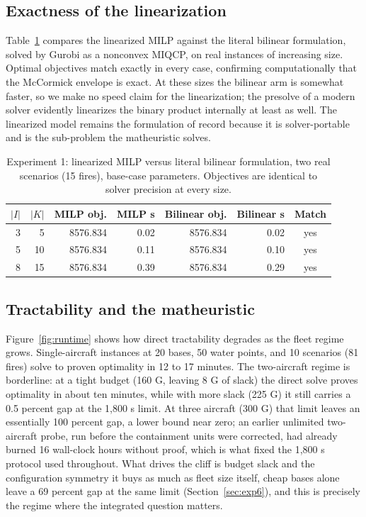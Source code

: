 \documentclass[11pt]{article}
\begin{document}
\subsection{Exactness of the linearization}
\label{sec:exp1}

Table~\ref{tab:exp1} compares the linearized MILP against the literal
bilinear formulation, solved by Gurobi as a nonconvex MIQCP, on real
instances of increasing size. Optimal objectives match exactly in
every case, confirming computationally that the McCormick envelope is
exact. At these sizes the bilinear arm is somewhat faster, so we make
no speed claim for the linearization; the presolve of a modern solver
evidently linearizes the binary product internally at least as well.
The linearized model remains the formulation of record because it is
solver-portable and is the sub-problem the matheuristic solves.

\begin{table}[!htbp]
\centering
\caption{Experiment 1: linearized MILP versus literal bilinear
formulation, two real scenarios (15 fires), base-case parameters.
Objectives are identical to solver precision at every size.}
\label{tab:exp1}
\small
\begin{tabular}{rrrrrrc}
\toprule
$|I|$ & $|K|$ & MILP obj. & MILP s & Bilinear obj. & Bilinear s & Match \\
\midrule
3 & 5  & 8576.834 & 0.02 & 8576.834 & 0.02 & yes \\
5 & 10 & 8576.834 & 0.11 & 8576.834 & 0.10 & yes \\
8 & 15 & 8576.834 & 0.39 & 8576.834 & 0.29 & yes \\
\bottomrule
\end{tabular}
\end{table}

\subsection{Tractability and the matheuristic}
\label{sec:exp2}

Figure~\ref{fig:runtime} shows how direct tractability degrades as
the fleet regime grows. Single-aircraft instances at 20 bases, 50
water points, and 10 scenarios (81 fires) solve to proven optimality
in 12 to 17 minutes. The two-aircraft regime is borderline: at a
tight budget (160 G, leaving 8 G of slack) the direct solve proves
optimality in about ten minutes, while with more slack (225 G) it
still carries a 0.5 percent gap at the 1,800 s limit. At three
aircraft (300 G) that limit leaves an essentially 100 percent gap, a
lower bound near zero; an earlier unlimited two-aircraft probe, run
before the containment units were corrected, had already burned 16
wall-clock hours without proof, which is what fixed the 1,800 s
protocol used throughout. What drives the cliff is budget slack and
the configuration symmetry it buys as much as fleet size itself,
cheap bases alone leave a 69 percent gap at the same limit
(Section~\ref{sec:exp6}), and this is precisely the regime where the
integrated question matters.
\end{document}
